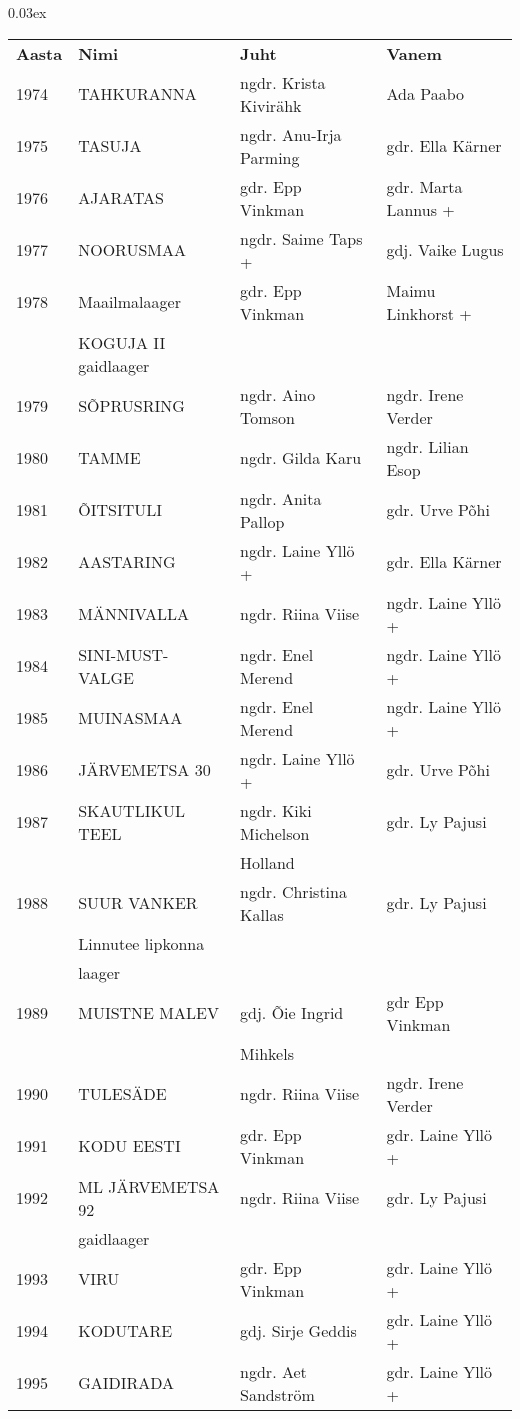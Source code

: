 \documentclass[12pt]{extbook}
\begin{document}
{\centering\scriptsize\arrayrulewidth 0.03ex
\begin{tabular*}{1.0\textwidth}{@{\extracolsep{\fill}}@{}l@{}@{}l@{}@{}l@{}@{}l@{}}
\bf{Aasta}	&	\bf{Nimi}				&	\bf{Juht}				&	\bf{Vanem}\\[2mm]
	1974	&	TAHKURANNA				&	ngdr. Krista Kivir\"ahk	&	Ada Paabo\\[2mm]
	1975	&	TASUJA					&	ngdr. Anu-Irja Parming	&	gdr. Ella K\"arner\\[2mm]
	1976	&	AJARATAS				&	gdr. Epp Vinkman		&	gdr. Marta Lannus +\\[2mm]
	1977	&	NOORUSMAA				&	ngdr. Saime Taps +		&	gdj. Vaike Lugus\\[2mm]
	1978	&	Maailmalaager 			&	gdr. Epp Vinkman		&	Maimu Linkhorst +\\
			&	KOGUJA II gaidlaager	&							&	\\[2mm]
	1979	&	S\~OPRUSRING			&	ngdr. Aino Tomson		&	ngdr. Irene Verder\\[2mm]
	1980	&	TAMME					&	ngdr. Gilda Karu		&	ngdr. Lilian Esop\\[2mm]
	1981	&	\~OITSITULI				&	ngdr. Anita Pallop		&	gdr. Urve P\~ohi\\[2mm]
	1982	&	AASTARING				&	ngdr. Laine Yll\"o +	&	gdr. Ella K\"arner\\[2mm]
	1983	&	M\"ANNIVALLA			&	ngdr. Riina Viise		&	ngdr. Laine Yll\"o +\\[2mm]
	1984	&	SINI-MUST-VALGE			&	ngdr. Enel Merend		&	ngdr. Laine Yll\"o +\\[2mm]
	1985	&	MUINASMAA				&	ngdr. Enel Merend		&	ngdr. Laine Yll\"o +\\[2mm]
	1986	&	J\"ARVEMETSA 30			&	ngdr. Laine Yll\"o +	&	gdr. Urve P\~ohi\\[2mm]
	1987	&	SKAUTLIKUL TEEL			&	ngdr. Kiki Michelson 	&	gdr. Ly Pajusi\\
			&							&	Holland					&	\\[2mm]
	1988	&	SUUR VANKER				&	ngdr. Christina Kallas	&	gdr. Ly Pajusi\\
			&	Linnutee lipkonna 		&							&	\\
			&	laager					&							&	\\[2mm]
	1989	&	MUISTNE MALEV			&	gdj. \~Oie Ingrid 		&	gdr Epp Vinkman\\
			&							&	Mihkels					&	\\[2mm]
	1990	&	TULES\"ADE				&	ngdr. Riina Viise		&	ngdr. Irene Verder\\[2mm]
	1991	&	KODU EESTI				&	gdr. Epp Vinkman		&	gdr. Laine Yll\"o +\\[2mm]
	1992	&	ML J\"ARVEMETSA 92		&	ngdr. Riina Viise		&	gdr. Ly Pajusi\\
			&	gaidlaager				&							&	\\[2mm]
	1993	&	VIRU					&	gdr. Epp Vinkman		&	gdr. Laine Yll\"o +\\[2mm]
	1994	&	KODUTARE				&	gdj. Sirje Geddis		&	gdr. Laine Yll\"o +\\[2mm]
	1995	&	GAIDIRADA				&	ngdr. Aet Sandstr\"om	&	gdr. Laine Yll\"o +\\[2mm]
\end{tabular*}}
\end{document}
